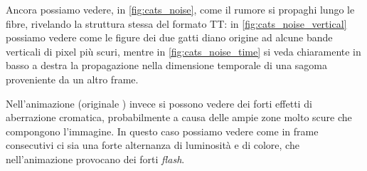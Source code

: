 \documentclass[11pt,a4paper]{article}
\begin{document}
Ancora possiamo vedere, in \ref{fig:cats_noise}, come il rumore  si propaghi lungo le fibre, rivelando la struttura stessa del formato TT: in \ref{fig:cats_noise_vertical} possiamo vedere come le figure dei due gatti diano origine ad alcune bande verticali di pixel più scuri, mentre in \ref{fig:cats_noise_time} si veda chiaramente in basso a destra la propagazione nella dimensione temporale di una sagoma proveniente da un altro frame.

Nell'animazione \href{http://poisson.phc.unipi.it/~bianucci/shared/tesi/muhammad_ali_TT.gif}{} (originale \href{http://poisson.phc.unipi.it/~bianucci/shared/tesi/muhammad_ali.gif}{}) invece si possono vedere dei forti effetti di aberrazione cromatica, probabilmente a causa delle ampie zone molto scure che compongono l'immagine. In questo caso possiamo vedere come in frame consecutivi ci sia una forte alternanza di luminosità e di colore, che nell'animazione provocano dei forti \emph{flash}.
\end{document}

